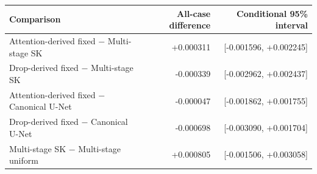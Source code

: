 \begin{tabular}{lrr}
\toprule
Comparison & All-case difference & Conditional 95\% interval \\
\midrule
Attention-derived fixed $-$ Multi-stage SK & +0.000311 & [-0.001596, +0.002245] \\
Drop-derived fixed $-$ Multi-stage SK & -0.000339 & [-0.002962, +0.002437] \\
Attention-derived fixed $-$ Canonical U-Net & -0.000047 & [-0.001862, +0.001755] \\
Drop-derived fixed $-$ Canonical U-Net & -0.000698 & [-0.003090, +0.001704] \\
Multi-stage SK $-$ Multi-stage uniform & +0.000805 & [-0.001506, +0.003058] \\
\bottomrule
\end{tabular}

